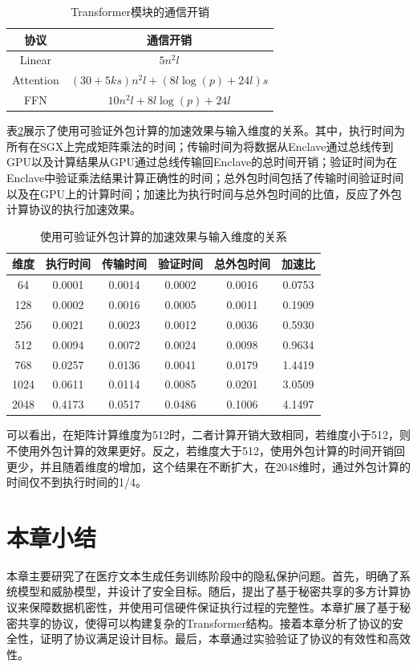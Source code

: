 \begin{table}[]
	\centering
	\caption{Transformer模块的通信开销}
	\begin{tabular}{|c|c|}
		\hline
		协议&通信开销
		\\ \hline
		Linear&$5n^2l$    \\ \hline
		Attention&$(30+5ks)n^2l+(8l\log(p)+24l)s$   \\ \hline
		FFN&$10n^2l+8l\log(p)+24l$   \\ \hline
		
	\end{tabular}
	\label{communication_cost}
\end{table}


表\ref{Outsource}展示了使用可验证外包计算的加速效果与输入维度的关系。其中，执行时间为所有在SGX上完成矩阵乘法的时间；传输时间为将数据从Enclave通过总线传到GPU以及计算结果从GPU通过总线传输回Enclave的总时间开销；验证时间为在Enclave中验证乘法结果计算正确性的时间；总外包时间包括了传输时间验证时间以及在GPU上的计算时间；加速比为执行时间与总外包时间的比值，反应了外包计算协议的执行加速效果。

\begin{table}[]
\centering
\caption{使用可验证外包计算的加速效果与输入维度的关系}
\begin{tabular}{|c|c|c|c|c|c|}
	\hline
	维度&执行时间&传输时间&验证时间&总外包时间&加速比
	   \\ \hline
	64&0.0001&0.0014&0.0002&0.0016&0.0753    \\ \hline
	128&0.0002&0.0016&0.0005&0.0011&0.1909    \\ \hline
	256&0.0021&0.0023&0.0012&0.0036&0.5930    \\ \hline
	512&0.0094&0.0072&0.0024&0.0098&0.9634    \\ \hline
	768&0.0257&0.0136&0.0041&0.0179&1.4419   \\ \hline
	1024&0.0611&0.0114&0.0085&0.0201&3.0509    \\ \hline
	2048&0.4173&0.0517&0.0486&0.1006&4.1497    \\ \hline
\end{tabular}
\label{Outsource}
\end{table}

可以看出，在矩阵计算维度为512时，二者计算开销大致相同，若维度小于512，则不使用外包计算的效果更好。反之，若维度大于512，使用外包计算的时间开销回更少，并且随着维度的增加，这个结果在不断扩大，在2048维时，通过外包计算的时间仅不到执行时间的1/4。

\section{本章小结}

本章主要研究了在医疗文本生成任务训练阶段中的隐私保护问题。首先，明确了系统模型和威胁模型，并设计了安全目标。随后，提出了基于秘密共享的多方计算协议来保障数据机密性，并使用可信硬件保证执行过程的完整性。本章扩展了基于秘密共享的协议，使得可以构建复杂的Transformer结构。接着本章分析了协议的安全性，证明了协议满足设计目标。最后，本章通过实验验证了协议的有效性和高效性。